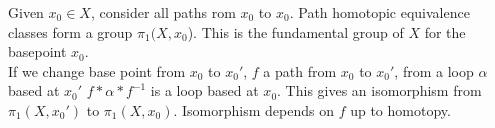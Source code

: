 \noindent
Given $x_0 \in X$, consider all paths rom $x_0$ to $x_0$. Path homotopic equivalence classes form a group $\pi_1(X, x_0$). This is the fundamental group of $X$ for the basepoint $x_0$. \\
If we change base point from $x_0$ to $x_0'$, $f$ a path from $x_0$ to $x_0'$, from a loop $\alpha$ based at $x_0'$ $f * \alpha *f^{-1}$ is a loop based at $x_0$. This gives an isomorphism from $\pi_1(X, x_0')$ to $\pi_1(X, x_0)$. Isomorphism depends on $f$ up to homotopy. 